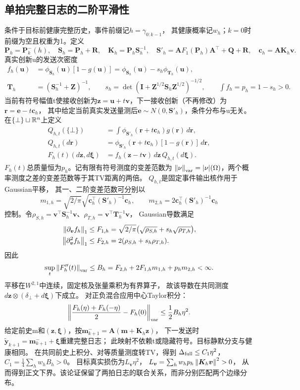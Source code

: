 \subsection{单拍完整日志的二阶平滑性}
条件于目标前健康完整历史，事件前缀记$h=\gamma_{0:k-1}$，
其健康概率记$w_h$；$k=0$时前缀为空且权重为1。定义
\[
{\bm{P}}_h={\bm{P}}_k^-(h),\quad {\bm{S}}_h={\bm{P}}_h+{\bm{R}},\quad {\bm{K}}_h={\bm{P}}_h{\bm{S}}_h^{-1},\quad
{\bm{S}}'_h={\bm{A}}F_1({\bm{P}}_h){\bm{A}}^\top+{\bm{Q}}+{\bm{R}},\quad {\bm{c}}_h={\bm{A}}{\bm{K}}_h{\bm{v}}.
\]
真实创新u的发送次密度
\begin{align*}
f_h({\bm{u}})&=\phi_{{\bm{S}}_h}({\bm{u}})[1-g({\bm{u}})]
=\phi_{{\bm{S}}_h}({\bm{u}})-s_h\phi_{{\bm{T}}_h}({\bm{u}}),\\
{\bm{T}}_h&=({\bm{S}}_h^{-1}+{\bm{Z}})^{-1},\qquad
s_h=\det({\bm{I}}+{\bm{Z}}^{1/2}{\bm{S}}_h{\bm{Z}}^{1/2})^{-1/2},\qquad
\int f_h=p_h=1-s_h>0.
\end{align*}
当前有符号幅值t使接收创新为${\bm{z}}={\bm{u}}+t{\bm{v}}$，下一接收创新（不再修改）为${\bm{r}}={\bm{e}}-t{\bm{c}}_h$，
其中给定当前真实发送量测后${\bm{e}}\sim N(0,{\bm{S}}'_h)$，条件分布与u无关。
在$\{\bot\}\sqcup\mathbb R^n$上定义
\begin{align*}
Q_{h,t}(\{\bot\})&=\int\phi_{{\bm{S}}'_h}({\bm{r}}+t{\bm{c}}_h)g({\bm{r}})\,d{\bm{r}},\\
Q_{h,t}(d{\bm{r}})&=\phi_{{\bm{S}}'_h}({\bm{r}}+t{\bm{c}}_h)[1-g({\bm{r}})]\,d{\bm{r}},\\
F_h(t)(d{\bm{z}},d{\bm{\xi}})&=f_h({\bm{z}}-t{\bm{v}})\,d{\bm{z}}\,Q_{h,t}(d{\bm{\xi}}).
\end{align*}
$F_h(t)$总质量恒为$p_h$。记有限有符号测度的变差范数为
$\left\|\nu\right\|_{\rm var}=|\nu|(\Omega)$，两个概率测度之差的变差范数等于其TV距离的两倍。
$Q_{h,t}$是固定事件输出核作用于Gaussian平移，
其一、二阶变差范数可分别以
\[
m_{1,h}=\sqrt{2/\pi}\sqrt{{\bm{c}}_h^\top({\bm{S}}'_h)^{-1}{\bm{c}}_h},\qquad
m_{2,h}=2{\bm{c}}_h^\top({\bm{S}}'_h)^{-1}{\bm{c}}_h
\]
控制。令$\rho_{S,h}={\bm{v}}^\top {\bm{S}}_h^{-1}{\bm{v}}$、$\rho_{T,h}={\bm{v}}^\top {\bm{T}}_h^{-1}{\bm{v}}$，
Gaussian导数满足
\begin{align*}
\left\|\partial_{\bm{v}}f_h\right\|_1&\le F_{1,h}
=\sqrt{2/\pi}\bigl(\sqrt{\rho_{S,h}}+s_h\sqrt{\rho_{T,h}}\bigr),\\
\left\|\partial_{\bm{v}}^2f_h\right\|_1&\le F_{2,h}=2(\rho_{S,h}+s_h\rho_{T,h}).
\end{align*}
因此
\[
\sup_t\left\|F_h''(t)\right\|_{\rm var}
\le B_h=F_{2,h}+2F_{1,h}m_{1,h}+p_hm_{2,h}<\infty.
\]
平移在$W^{2,1}$中连续，固定核及张量乘积为有界算子，
故该导数在共同测度$d{\bm{z}}\otimes(\delta_\bot+d{\bm{\xi}})$下成立。
对正负混合应用中心Taylor积分：
\[
\left\|\frac{F_h(\eta)+F_h(-\eta)}2-F_h(0)\right\|_{\rm var}
\le\frac12B_h\eta^2.
\]
给定前史m和$({\bm{z}},{\bm{\xi}})$，按${\bm{m}}_{k+1}^-={\bm{A}}({\bm{m}}+{\bm{K}}_h{\bm{z}})$，
下一发送时$\tilde {\bm{y}}_{k+1}={\bm{m}}_{k+1}^-+{\bm{\xi}}$重建完整日志；
此映射不依赖t或隐藏符号。目标静默分支与健康相同。
在共同前史上积分、对等质量测度转TV，得到
$\Delta_{\rm full}\le C_1\eta^2$，
$C_1=\frac14\sum_hw_hB_h>0$。
目标真实损伤为$L_{\bm{v}}\eta^2$，
$L_{\bm{v}}=\sum_hw_hp_h\left\|{\bm{K}}_h{\bm{v}}\right\|^2>0$，
从而得到正文下界。该论证保留了两拍日志的联合关系，而非分别匹配两个边缘分布。

